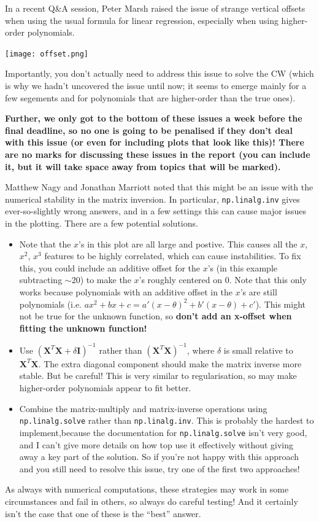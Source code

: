 \documentclass[10pt]{article}
\begin{document}
In a recent Q\&A session, Peter Marsh raised the issue of strange vertical offsets when using the usual formula for linear regression, especially when using higher-order polynomials.

\texttt{[image: offset.png]}

Importantly, you don't actually need to address this issue to solve the CW (which is why we hadn't uncovered the issue until now; it seems to emerge mainly for a few segements and for polynomials that are higher-order than the true ones).

\textbf{Further, we only got to the bottom of these issues a week before the final deadline, so no one is going to be penalised if they don't deal with this issue (or even for including plots that look like this)! There are no marks for discussing these issues in the report (you can include it, but it will take space away from topics that will be marked).}

Matthew Nagy and Jonathan Marriott noted that this might be an issue with the numerical stability in the matrix inversion.
In particular, \texttt{np.linalg.inv} gives ever-so-slightly wrong answers, and in a few settings this can cause major issues in the plotting.
There are a few potential solutions.
\begin{itemize}
  \item Note that the $x$'s in this plot are all large and postive.  This causes all the $x$, $x^2$, $x^3$ features to be highly correlated, which can cause instabilities. To fix this, you could include an additive offset for the $x$'s (in this example subtracting $\sim 20$) to make the $x$'s roughly centered on $0$.  Note that this only works because polynomials with an additive offset in the $x$'s are still polynomials (i.e. $a x^2 + b x + c = a' (x-\theta)^2 + b' (x-\theta) + c'$).  This might not be true for the unknown function, so \textbf{don't add an x-offset when fitting the unknown function!}
  \item Use $(\mathbf{X}^T \mathbf{X} + \delta \mathbf{I})^{-1}$ rather than $(\mathbf{X}^T \mathbf{X})^{-1}$, where $\delta$ is small relative to $\mathbf{X}^T \mathbf{X}$.  The extra diagonal component should make the matrix inverse more stable.  But be careful!  This is very similar to regularisation, so may make higher-order polynomials appear to fit better.
  \item Combine the matrix-multiply and matrix-inverse operations using \texttt{np.linalg.solve} rather than \texttt{np.linalg.inv}.  This is probably the hardest to implement,because the documentation for \texttt{np.linalg.solve} isn't very good, and I can't give more details on how top use it effectively without giving away a key part of the solution.  So if you're not happy with this approach and you still need to resolve this issue, try one of the first two approaches!
\end{itemize}
As always with numerical computations, these strategies may work in some circumstances and fail in others, so always do careful testing!
And it certainly isn't the case that one of these is the ``best'' answer.
\end{document}
